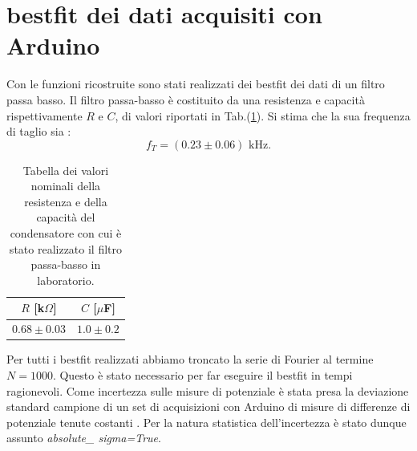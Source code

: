 \documentclass{article}
\begin{document}
\section{bestfit dei dati acquisiti con Arduino}
    \label{sez:bestfit_ft}
    Con le funzioni ricostruite sono stati realizzati dei bestfit dei dati
    di un filtro passa basso.
    Il filtro passa-basso è costituito da una resistenza e capacità rispettivamente $R$ e $C$, di valori riportati in Tab.(\ref{tab:val_nom}).
    Si stima che la sua frequenza di taglio sia :
   $$
   f_T = (0.23 \pm 0.06) \text{ kHz}.
   $$
    \begin{table}[htbp]
        \centering
        \begin{tabular}{c c}
            \hline
            $R$ [k$\Omega$] & $C$ [$\mu$F] \\
            \hline
            $0.68 \pm 0.03$ & $1.0 \pm 0.2$ \\
            \hline
        \end{tabular}
        \caption{Tabella dei valori nominali della resistenza e della capacità del condensatore con cui è stato realizzato il filtro passa-basso in laboratorio.}
        \label{tab:val_nom}
    \end{table}
  
    Per tutti i bestfit realizzati abbiamo troncato la serie di Fourier al termine $N=1000$. Questo è stato necessario per far eseguire il 
    bestfit in tempi ragionevoli.
    Come incertezza sulle misure di potenziale è stata
    presa la deviazione standard campione di un set di acquisizioni con Arduino 
    di misure di differenze di potenziale tenute costanti \cite{Antonacci_Sermi2024}.
    Per la natura statistica dell'incertezza è stato dunque assunto \emph{absolute\_ sigma=True}.
\end{document}

